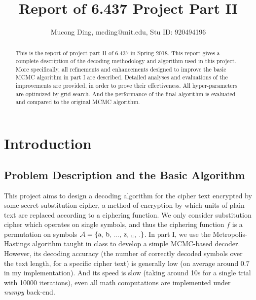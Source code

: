 \documentclass[10pt, twocolumn]{article}
\begin{document}
\title{Report of 6.437 Project Part II}

\author{Mucong Ding, mcding@mit.edu, Stu ID: 920494196}


\maketitle

\begin{abstract}
This is the report of project part II of 6.437 in Spring 2018. This report gives a complete description of the decoding methodology and algorithm used in this project. More specifically, all refinements and enhancements designed to improve the basic MCMC algorithm in part I are described. Detailed analyses and evaluations of the improvements are provided, in order to prove their effectiveness. All hyper-parameters are optimized by grid-search. And the performance of the final algorithm is evaluated and compared to the original MCMC algorithm.
\end{abstract}

\section{\label{sec1}Introduction}
\subsection{Problem Description and the Basic Algorithm}
This project aims to design a decoding algorithm for the cipher text encrypted by some secret substitution cipher, a method of encryption by which units of plain text are replaced according to a ciphering function. We only consider substitution cipher which operates on single symbols, and thus the ciphering function $f$ is a permutation on symbols $\mathcal{A}=\{\text{a, b, ..., z, \textvisiblespace, .}\}$. In part I, we use the Metropolis-Hastings algorithm taught in class to develop a simple MCMC-based decoder. However, its decoding accuracy (the number of correctly decoded symbols over the text length, for a specific cipher text) is generally low (on average around $0.7$ in my implementation). And its speed is slow (taking around 10s for a single trial with 10000 iterations), even all math computations are implemented under \textit{numpy} back-end.
\end{document}
